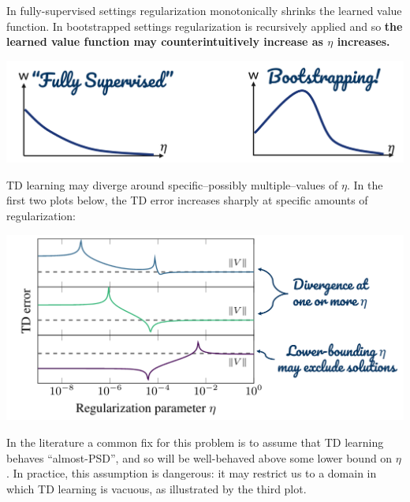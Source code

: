 In fully-supervised settings regularization monotonically shrinks the learned value function. In bootstrapped settings regularization is recursively applied and so \textbf{the learned value function may counterintuitively increase as $\eta$ increases.}
\begin{center}
    \includegraphics[scale=0.4]{parts/nonmonotonic/illus.png}
\end{center}
TD learning may diverge around specific--possibly multiple--values of $\eta$. In the first two plots below, the TD error increases sharply at specific amounts of regularization:
\begin{center}
    \hspace*{1in}
    \includegraphics[scale=0.4]{parts/nonmonotonic/threeex.png}
\end{center}
In the literature a common fix for this problem is to assume that TD learning behaves ``almost-PSD'', and so will be well-behaved above some lower bound on $\eta$. In practice, this assumption is dangerous: it may restrict us to a domain in which TD learning is vacuous, as illustrated by the third plot.
